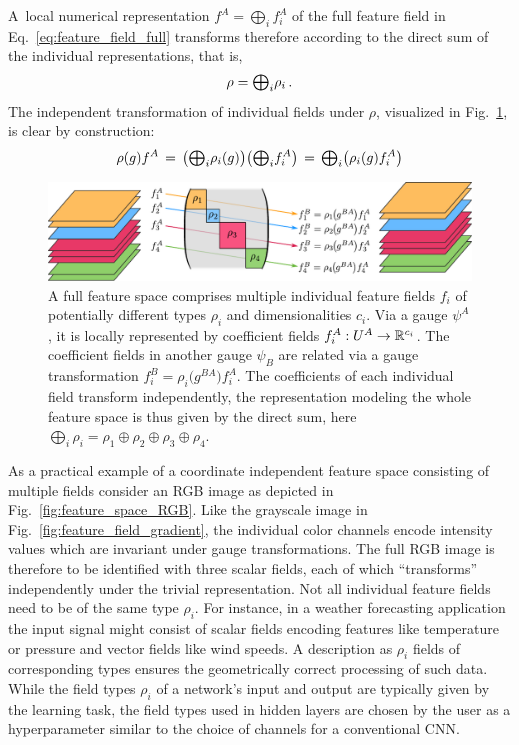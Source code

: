 A~local numerical representation $f^A = \bigoplus_i f_i^A$ of the full feature field in Eq.~\eqref{eq:feature_field_full} transforms therefore according to the direct sum of the individual representations, that is,
\begin{align}
    \rho = \scalebox{1.1}{$\bigoplus$}_i \rho_i \,.
\end{align}
The independent transformation of individual fields under $\rho$, visualized in Fig.~\ref{fig:feature_spaces_oplus}, is clear by construction:
\begin{align}
    \rho(g)f^A
    \,=\, \left(\scalebox{1.1}{$\bigoplus$}_i \rho_i(g)\right) \! \left(\scalebox{1.1}{$\bigoplus$}_i f_i^A\right)
    \,=\, \scalebox{1.1}{$\bigoplus$}_i \! \left(\rho_i(g) f_i^A\right)
\end{align}

\begin{figure}
    \centering
    \includegraphics[width=.94\textwidth]{figures/feature_field_repr_examples.pdf}
    \vspace*{0ex}
    \caption{\small
        A full feature space comprises multiple individual feature fields $f_i$ of potentially different types $\rho_i$ and dimensionalities $c_i$.
        Via a gauge $\psi^A$, it is locally represented by coefficient fields $f_i^A: U^A \to \mathbb{R}^{c_i}$.
        The coefficient fields in another gauge $\psi_B$ are related via a gauge transformation $f_i^B = \rho_i\big(g^{BA}\big)f_i^A$.
        The coefficients of each individual field transform independently, the representation modeling the whole feature space is thus given by the direct sum, here $\bigoplus_i \!\rho_i = \rho_1 \oplus \rho_2 \oplus \rho_3 \oplus \rho_4$.
    }
    \label{fig:feature_spaces_oplus}
\end{figure}

As a practical example of a coordinate independent feature space consisting of multiple fields consider an RGB image as depicted in Fig.~\ref{fig:feature_space_RGB}.
Like the grayscale image in Fig.~\ref{fig:feature_field_gradient}, the individual color channels encode intensity values which are invariant under gauge transformations.
The full RGB image is therefore to be identified with three scalar fields, each of which ``transforms'' independently under the trivial representation.
Not all individual feature fields need to be of the same type $\rho_i$.
For instance, in a weather forecasting application the input signal might consist of scalar fields encoding features like temperature or pressure and vector fields like wind speeds.
A description as $\rho_i$ fields of corresponding types ensures the geometrically correct processing of such data.
While the field types $\rho_i$ of a network's input and output are typically given by the learning task, the field types used in hidden layers are chosen by the user as a hyperparameter similar to the choice of channels for a conventional CNN.